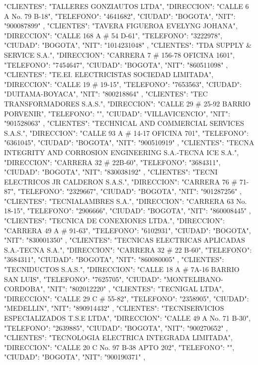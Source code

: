    {
   "CLIENTES": "TALLERES GONZIAUTOS LTDA",
   "DIRECCION": "CALLE 6 A No. 79 B-18",
   "TELEFONO": "4641682",
   "CIUDAD": "BOGOTA",
   "NIT": "900087899"
   },
   {
   "CLIENTES": "TAVERA FIGUEROA EVELYNG JOHANA",
   "DIRECCION": "CALLE 168 A # 54 D-61",
   "TELEFONO": "3222978",
   "CIUDAD": "BOGOTA",
   "NIT": "1014231048"
   },
   {
   "CLIENTES": "TDA SUPPLY & SERVICE S.A.",
   "DIRECCION": "CARRERA 7 # 156-78 OFICINA 1601",
   "TELEFONO": "7454647",
   "CIUDAD": "BOGOTA",
   "NIT": "860511098"
   },
   {
   "CLIENTES": "TE.EI. ELECTRICISTAS SOCIEDAD LIMITADA",
   "DIRECCION": "CALLE 19 # 19-15",
   "TELEFONO": "7653563",
   "CIUDAD": "DUITAMA-BOYACA",
   "NIT": "800218864"
   },
   {
   "CLIENTES": "TEC TRANSFORMADORES S.A.S.",
   "DIRECCION": "CALLE 29 # 25-92 BARRIO PORVENIR",
   "TELEFONO": "",
   "CIUDAD": "VILLAVICENCIO",
   "NIT": "901528063"
   },
   {
   "CLIENTES": "TECHNICAL AND COMMERCIAL SERVICES S.A.S.",
   "DIRECCION": "CALLE 93 A # 14-17 OFICINA 701",
   "TELEFONO": "6361045",
   "CIUDAD": "BOGOTA",
   "NIT": "900510919"
   },
   {
   "CLIENTES": "TECNA INTEGRITY AND CORROSION ENGINEERING S.A.-TECNA ICE S.A.",
   "DIRECCION": "CARRERA 32 # 22B-60",
   "TELEFONO": "3684311",
   "CIUDAD": "BOGOTA",
   "NIT": "830038192"
   },
   {
   "CLIENTES": "TECNI ELECTRICOS JR CALDERON S.A.S.",
   "DIRECCION": "CARRERA 76 # 71-87",
   "TELEFONO": "2329667",
   "CIUDAD": "BOGOTA",
   "NIT": "901287256"
   },
   {
   "CLIENTES": "TECNIALAMBRES S.A.",
   "DIRECCION": "CARRERA 63 No. 18-15",
   "TELEFONO": "2906666",
   "CIUDAD": "BOGOTA",
   "NIT": "860008445"
   },
   {
   "CLIENTES": "TECNICA DE CONEXIONES LTDA.",
   "DIRECCION": "CARRERA 49 A # 91-63",
   "TELEFONO": "6102931",
   "CIUDAD": "BOGOTA",
   "NIT": "830001350"
   },
   {
   "CLIENTES": "TECNICAS ELECTRICAS APLICADAS S.A.-TECNA S.A.",
   "DIRECCION": "CARRERA 32 # 22 B-60",
   "TELEFONO": "3684311",
   "CIUDAD": "BOGOTA",
   "NIT": "860080005"
   },
   {
   "CLIENTES": "TECNIDUCTOS S.A.S.",
   "DIRECCION": "CALLE 18 A # 7A-16 BARRIO SAN LUIS",
   "TELEFONO": "7625705",
   "CIUDAD": "MONTELIBANO-CORDOBA",
   "NIT": "802012220"
   },
   {
   "CLIENTES": "TECNIGAL LTDA",
   "DIRECCION": "CALLE 29 C # 55-82",
   "TELEFONO": "2358905",
   "CIUDAD": "MEDELLIN",
   "NIT": "890914432"
   },
   {
   "CLIENTES": "TECNISERVICIOS ESPECIALIZADOS T.S.E LTDA",
   "DIRECCION": "CALLE 49 A No. 71 B-30",
   "TELEFONO": "2639885",
   "CIUDAD": "BOGOTA",
   "NIT": "900270652"
   },
   {
   "CLIENTES": "TECNOLOGIA ELECTRICA INTEGRADA LIMITADA",
   "DIRECCION": "CALLE 20 C No. 97 B-38 APTO 202",
   "TELEFONO": "",
   "CIUDAD": "BOGOTA",
   "NIT": "900190371"
   },
